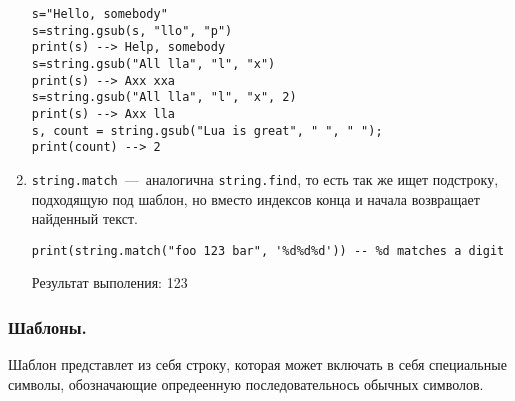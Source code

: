 \begin{enumerate}
\begin{lstlisting}
s="Hello, somebody"
s=string.gsub(s, "llo", "p")
print(s) --> Help, somebody
s=string.gsub("All lla", "l", "x")
print(s) --> Axx xxa
s=string.gsub("All lla", "l", "x", 2)
print(s) --> Axx lla
s, count = string.gsub("Lua is great", " ", " ");
print(count) --> 2
\end{lstlisting}
	
	\item \lstinline{string.match}~---~аналогична \lstinline{string.find}, то есть так же ищет подстроку, подходящую под шаблон, но вместо индексов конца и начала возвращает найденный текст. 
	
\begin{lstlisting}
print(string.match("foo 123 bar", '%d%d%d')) -- %d matches a digit
\end{lstlisting}

Результат выполения:
123

\end{enumerate} 

\subsubsection{Шаблоны.}
Шаблон представлет из себя строку, которая может включать в себя специальные символы, обозначающие опредеенную последовательнось обычных символов. 

